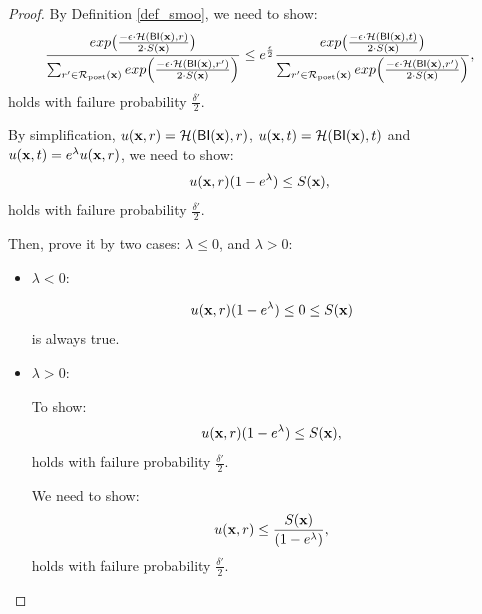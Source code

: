 \documentclass{article}
\begin{document}
\begin{proof}
        By Definition \ref{def_smoo}, we need to show:
        \begin{equation*}
        \frac {exp\big(\frac{-\epsilon\cdot\mathcal{H}(\mathsf{BI}(\textbf{x}),r)}{2\cdot S(\textbf{x})}\big)}{\sum_{r'\in \mathcal{R}_{\textup{post}}(\textbf{x})} exp \Big(\frac{-\epsilon\cdot \mathcal{H} (\mathsf{BI}(\textbf{x}),r')}{2 \cdot S(\textbf{x})}\Big)}
        \leq
        e^{\frac{\epsilon}{2}} \frac {exp\big(\frac{-\epsilon\cdot\mathcal{H}(\mathsf{BI}(\textbf{x}),t)}{2\cdot S(\textbf{x})}\big)}{\sum_{r'\in \mathcal{R}_{\textup{post}}(\textbf{x})} exp \Big(\frac{-\epsilon\cdot \mathcal{H} (\mathsf{BI}(\textbf{x}),r')}{2 \cdot S(\textbf{x})}\Big)},
        \end{equation*}
        holds with failure probability $\frac{\delta'}{2}$.

        By simplification, $u(\textbf{x}, {r}) = \mathcal{H}(\mathsf{BI}(\textbf{x}),r)$, $u(\textbf{x}, {t}) = \mathcal{H}(\mathsf{BI}(\textbf{x}),t)$ and $u(\textbf{x}, {t}) = e^{\lambda} u(\textbf{x}, {r})$, we need to show:
        \begin{equation*}
        u(\textbf{x}, {r})(1 - e ^ {\lambda})
        \leq 
        S(\textbf{x}),
        \end{equation*}
        holds with failure probability $\frac{\delta'}{2}$.

        Then, prove it by two cases: $\lambda \leq 0$, and $\lambda > 0$:

      \begin{itemize}
        \item {\boldmath$\lambda < 0$}:

          \begin{equation*}
          u(\textbf{x}, {r})(1 - e ^ {\lambda}) \leq 0 \leq S(\textbf{x})
          \end{equation*}
          is always true.

        \item {\boldmath $\lambda > 0$}:

          To show:
          \begin{equation*}
          u(\textbf{x}, {r})(1 - e ^ {\lambda})
          \leq 
          S(\textbf{x}),
          \end{equation*}
          holds with failure probability $\frac{\delta'}{2}$.

          We need to show:
          \begin{equation}
          \label{eq_dilation_case2}
          u(\textbf{x}, {r})
          \leq 
          \frac{S(\textbf{x})}{(1 - e ^ {\lambda})},
          \end{equation}         
          holds with failure probability $\frac{\delta'}{2}$.


\end{itemize}
\end{proof}
\end{document}
